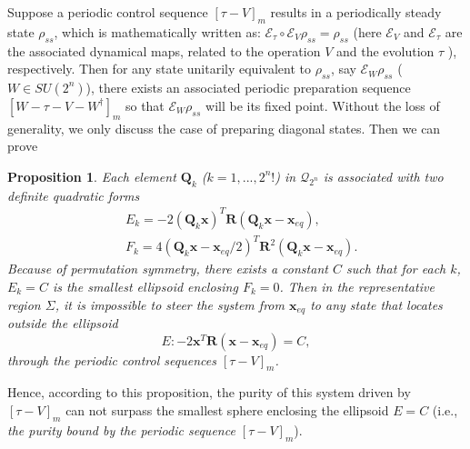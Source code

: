 \documentclass[prl,aps,twocolumn, reprint, amsmath,amssymb,showpacs,superscriptaddress]{revtex4}
\newtheorem*{proposition}{Proposition}
\begin{document}
Suppose a periodic control sequence ${\left[{\tau } - {V} \right]_m}$ results in a periodically steady state $\rho_{ss}$, which is mathematically written as: $\mathcal{E}_{\tau} \circ \mathcal{E}_{V} \rho_{ss} = \rho_{ss}$ (here $\mathcal{E}_{V}$ and $\mathcal{E}_{\tau}$ are the associated dynamical maps, related to the operation $V$ and the evolution $\tau$ \cite{RH}), respectively. Then for any state unitarily equivalent to $\rho_{ss}$, say $\mathcal{E}_{W} \rho_{ss}$ ($W \in SU(2^n)$), there exists an associated periodic preparation sequence ${\left[ W -  {\tau} - {V} - W^\dag \right]_m}$ so that $\mathcal{E}_{W} \rho_{ss}$ will be its fixed point. Without the loss of generality, we only discuss the case of preparing diagonal states. Then we can prove \cite{S1}
\begin{proposition}
Each element $\mathbf{Q}_k$ ($k=1,...,2^n!$) in $\mathcal{Q}_{2^n}$ is associated with two definite quadratic forms
\begin{align}
& E_k =  - 2{(\mathbf{Q}_k {\bm{x}})^T} \mathbf{R} (\mathbf{Q}_k {\bm{x}} - {\bm{x}_{eq}}),  \nonumber \\
& F_k = 4 {(\mathbf{Q}_k{\bm{x}} - {\bm{x}_{eq}}/2)^T} \mathbf{R}^2 (\mathbf{Q}_k{\bm{x}} - {\bm{x}_{eq}}).
\end{align}
Because of permutation symmetry, there exists a constant $C$ such that for each $k$, $E_k = C$ is the smallest ellipsoid enclosing $F_k = 0$.
Then in the representative region $\Sigma$,  it is impossible to steer the system from $\bm{x}_{eq}$ to any state that locates outside the ellipsoid
\begin{equation}
E: - 2{{\bm{x}}^T} \mathbf{R} ( {\bm{x}} - {\bm{x}_{eq}}) = C,
\end{equation}
through the periodic control sequences ${\left[ {\tau } - {V}  \right]_m}$.
\end{proposition}
Hence, according to this proposition, the purity of this system driven by ${\left[{\tau } - {V} \right]_m}$ can not surpass the smallest sphere enclosing the ellipsoid $E=C$ (i.e., \emph{the purity bound by the periodic sequence ${\left[{\tau } - {V} \right]_m}$}).
\end{document}

